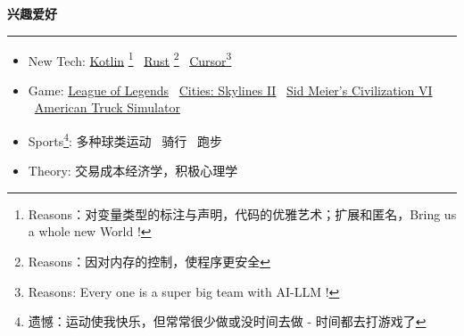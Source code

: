\documentclass[11pt,a4paper]{article}
\renewcommand{\section}[1]{%
    \vspace{0.6em}%
    {\sffamily\Large\bfseries\color{sectioncolor}#1}%
    \vspace{0.2em}%
    \hrule height 0.5pt
    \vspace{0.4em}%
}
\newcommand{\separator}{\textbullet~}  %
\begin{document}
\section{兴趣爱好}
\begin{itemize}
    \item New Tech: \href{https://kotlinlang.org/}{Kotlin} \footnote{Reasons：对变量类型的标注与声明，代码的优雅艺术；扩展和匿名，Bring us a whole new World ! } \separator \href{https://www.rust-lang.org/}{Rust} \footnote{Reasons：因对内存的控制，使程序更安全} \separator \href{https://www.cursor.com/}{Cursor\footnote{Reasons: Every one is a super big team with AI-LLM ! }}
    \item Game: \href{https://lol.qq.com/}{League of Legends} \separator \href{https://store.steampowered.com/app/949230/Cities_Skylines_II/}{Cities: Skylines II} \separator \href{https://store.steampowered.com/app/289070/Sid_Meiers_Civilization_VI/}{Sid Meier's Civilization VI} \separator \href{https://store.steampowered.com/app/270880/American_Truck_Simulator/}{American Truck Simulator}
    \item Sports\footnote{遗憾：运动使我快乐，但常常很少做或没时间去做 - 时间都去打游戏了}: 多种球类运动 \separator 骑行 \separator 跑步 
    \item Theory: 交易成本经济学，积极心理学
\end{itemize}
\end{document}
